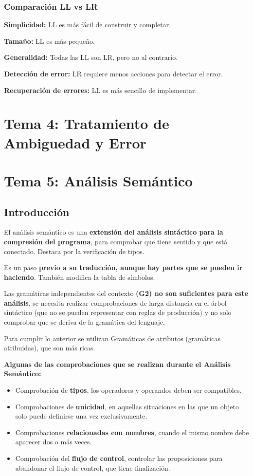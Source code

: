 \documentclass[12pt, twoside, openright]{report} %
\begin{document}
\subsection{Comparación LL vs LR}
\textbf{Simplicidad:} LL es más fácil de construir y completar.

\textbf{Tamaño:} LL es más pequeño.

\textbf{Generalidad:} Todas las LL son LR, pero no al contrario.

\textbf{Detección de error:} LR requiere menos acciones para detectar el error.

\textbf{Recuperación de errores:} LL es más sencillo de implementar.

\chapter{Tema 4: Tratamiento de Ambiguedad y Error}


\chapter{Tema 5: Análisis Semántico}

\section{Introducción}
El análisis semántico es una \textbf{extensión del análisis sintáctico para la compresión del programa}, para comprobar que tiene sentido y que está conectado. Destaca por la verificación de tipos.

Es un paso \textbf{previo a su traducción, aunque hay partes que se pueden ir haciendo}. También modifica la tabla de símbolos.

Las gramáticas independientes del contexto \textbf{(G2) no son suficientes para este análisis}, se necesita realizar comprobaciones de larga distancia en el árbol sintáctico (que no se pueden representar con reglas de producción) y no solo comprobar que se deriva de la gramática del lenguaje.

Para cumplir lo anterior se utilizan Gramáticas de atributos (gramáticas atribuidas), que son más ricas.

\textbf{Algunas de las comprobaciones que se realizan durante el Análisis Semántico:}
\begin{itemize}
  \item Comprobación de \textbf{tipos}, los operadores y operandos deben ser compatibles.
  \item Comprobaciones de \textbf{unicidad}, en aquellas situaciones en las que un objeto solo puede definirse una vez exclusivamente.
  \item Comprobaciones \textbf{relacionadas con nombres}, cuando el mismo nombre debe aparecer dos o más veces.
  \item Comprobación del \textbf{flujo de control}, controlar las proposiciones para abandonar el flujo de control, que tiene finalización.
\end{itemize}
\pagebreak
\end{document}
